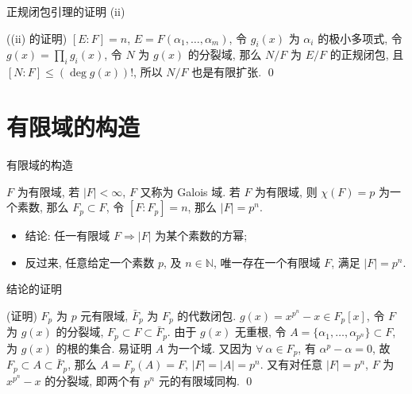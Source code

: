 
\begin{frame}{正规闭包引理的证明 (ii)}

\startproof[bg=yellow, fg=red]((ii) 的证明)
$[E:F] = n$, $E = F(\alpha_1, \dots, \alpha_m)$,
令 $g_i(x)$ 为 $\alpha_i$ 的极小多项式,
令 $g(x) = \prod_i g_i(x)$, 令 $N$ 为 $g(x)$ 的分裂域,
那么 $N/F$ 为 $E/F$ 的正规闭包, 且 $[N:F] \leq (\deg g(x))!$,
所以 $N/F$ 也是有限扩张.
\qed

\end{frame}


\section[有限域]{有限域的构造}


\begin{frame}{有限域的构造}

\begin{eg}[有限域的构造]
$F$ 为有限域, 若 $|F| < \infty$, $F$ 又称为 Galois 域.
若 $F$ 为有限域, 则 $\chi(F) = p$ 为一个素数, 那么 $F_p \subset F$,
令 $[F:F_p] = n$, 那么 $|F| = p^n$.
\end{eg}

\begin{itemize}
\item 结论: 任一有限域 $F \Longrightarrow |F|$ 为某个素数的方幂;
\item 反过来, 任意给定一个素数 $p$, 及 $n \in \mathbb{N}$,
  唯一存在一个有限域 $F$, 满足 $|F| = p^n$.
\end{itemize}

\end{frame}


\begin{frame}{结论的证明}

\startproof[bg=yellow, fg=red](证明)
$F_p$ 为 $p$ 元有限域, $\bar{F}_p$ 为 $F_p$ 的代数闭包.
$g(x) = x^{p^n} - x \in F_p[x]$, 令 $F$ 为 $g(x)$ 的分裂域,
$F_p \subset F \subset \bar{F}_p$.
由于 $g(x)$ 无重根, 令 $A = \{ \alpha_1, \dots, \alpha_{p^n} \} \subset F$,
为 $g(x)$ 的根的集合. 易证明 $A$ 为一个域.
又因为 $\forall\ \alpha \in F_p$, 有 $\alpha^p - \alpha = 0$,
故 $F_p \subset A \subset \bar{F}_p$,
那么 $A = F_p(A) = F$, $|F| = |A| = p^n$.
又有对任意 $|F| = p^n$, $F$ 为 $x^{p^n} - x$ 的分裂域,
即两个有 $p^n$ 元的有限域同构.
\qed

\end{frame}

